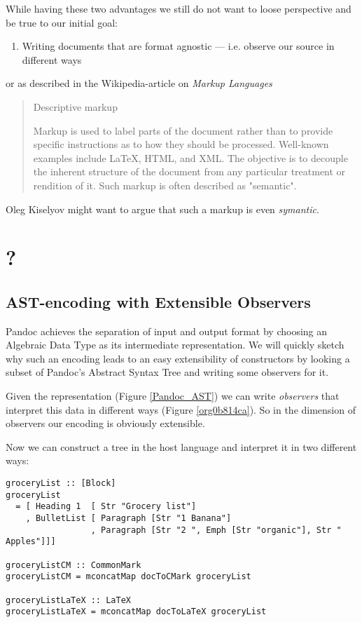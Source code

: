 \documentclass[format=acmsmall, review=true, screen=true]{acmart}
\begin{document}
While having these two advantages we still do not want to loose perspective and
be true to our initial goal:

\begin{enumerate}
\item Writing documents that are format agnostic — i.e. observe our source in
different ways
\end{enumerate}

or as described in the Wikipedia-article on \emph{Markup Languages}

\begin{quote}
Descriptive markup

Markup is used to label parts of the document rather than to provide specific
instructions as to how they should be processed. Well-known examples include
\LaTeX{}, HTML, and XML. The objective is to decouple the inherent structure of the
document from any particular treatment or rendition of it. Such markup is often
described as "semantic".
\end{quote}

Oleg Kiselyov might want to argue that such a markup is even \emph{symantic}.

\section{?}
\label{sec:org7537ecb}
\subsection{AST-encoding with Extensible Observers}
\label{sec:org5f9818b}

Pandoc achieves the separation of input and output format by choosing an
Algebraic Data Type as its intermediate representation. We will quickly sketch
why such an encoding leads to an easy extensibility of constructors by looking a
subset of Pandoc's Abstract Syntax Tree and writing some observers for it.

Given the representation (Figure \ref{Pandoc_AST}) we can write \emph{observers}
that interpret this data in different ways (Figure \ref{org0b814ca}). So in the
dimension of observers our encoding is obviously extensible.

Now we can construct a tree in the host language and interpret it in two
different ways:
\begin{lstlisting}
groceryList :: [Block]
groceryList
  = [ Heading 1  [ Str "Grocery list"]
    , BulletList [ Paragraph [Str "1 Banana"]
                 , Paragraph [Str "2 ", Emph [Str "organic"], Str " Apples"]]]

groceryListCM :: CommonMark
groceryListCM = mconcatMap docToCMark groceryList

groceryListLaTeX :: LaTeX
groceryListLaTeX = mconcatMap docToLaTeX groceryList
\end{lstlisting}
\end{document}
